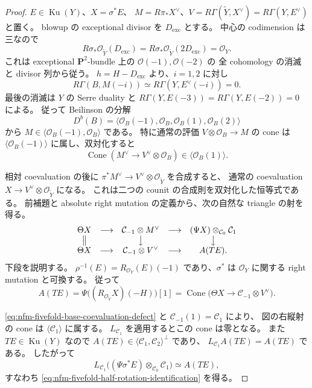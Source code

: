 \begin{proof}
$E\in\operatorname{Ku}(Y)$、$X=\sigma^*E$、
$M=R\pi_*X^\vee$、$V=R\Gamma(\widetilde Y,X^\vee)=R\Gamma(Y,E^\vee)$ と置く。
blowup の exceptional divisor を $D_{\mathrm{exc}}$ とする。
中心の codimension は三なので
\[
 R\sigma_*\mathcal O_{\widetilde Y}(D_{\mathrm{exc}})
 =R\sigma_*\mathcal O_{\widetilde Y}(2D_{\mathrm{exc}})=\mathcal O_Y.
\]
これは exceptional $\mathbf P^2$-bundle 上の $\mathcal O(-1),\mathcal O(-2)$ の
全 cohomology の消滅と divisor 列から従う。
$h=H-D_{\mathrm{exc}}$ より、$i=1,2$ に対し
\[
 R\Gamma(B,M(-i))
 \simeq R\Gamma(Y,E^\vee(-i))=0.
\]
最後の消滅は $Y$ の Serre duality と
$R\Gamma(Y,E(-3))=R\Gamma(Y,E(-2))=0$ による。
従って Beilinson の分解
\[
 D^b(B)=\langle\mathcal O_B(-1),\mathcal O_B,
                    \mathcal O_B(1),\mathcal O_B(2)\rangle
\]
から $M\in\langle\mathcal O_B(-1),\mathcal O_B\rangle$ である。
特に通常の評価 $V\otimes\mathcal O_B\to M$ の cone は
$\langle\mathcal O_B(-1)\rangle$ に属し、双対化すると
\begin{equation}\label{eq:nfm-fivefold-base-coevaluation-defect}
 \operatorname{Cone}(M^\vee\longrightarrow V^\vee\otimes\mathcal O_B)
 \in\langle\mathcal O_B(1)\rangle.
\end{equation}

相対 coevaluation の後に
$\pi^*M^\vee\to V^\vee\otimes\mathcal O_{\widetilde Y}$ を合成すると、
通常の coevaluation $X\to V^\vee\otimes\mathcal O_{\widetilde Y}$ になる。
これは二つの counit の合成則を双対化した恒等式である。
前補題と absolute right mutation の定義から、次の自然な triangle の射を得る。
\[
\begin{array}{ccccc}
 \Theta X&\longrightarrow&\mathcal C_{-1}\otimes M^\vee
 &\longrightarrow&(\Psi X)\otimes_{\mathcal C_0}\mathcal C_1\\
 \big\Vert&&\big\downarrow&&\big\downarrow\\
 \Theta X&\longrightarrow&\mathcal C_{-1}\otimes V^\vee
 &\longrightarrow&A(TE).
\end{array}
\]
下段を説明する。
$\rho^{-1}(E)=R_{\mathcal O_Y}(E)(-1)$ であり、$\sigma^*$ は
$\mathcal O_Y$ に関する right mutation と可換する。
従って
\[
 A(TE)=\Psi\bigl((R_{\mathcal O_{\widetilde Y}}X)(-H)\bigr)[1]
 =\operatorname{Cone}\bigl(\Theta X\to\mathcal C_{-1}\otimes V^\vee\bigr).
\]

\eqref{eq:nfm-fivefold-base-coevaluation-defect} と $\mathcal C_{-1}(1)=\mathcal C_1$ により、
図の右縦射の cone は $\langle\mathcal C_1\rangle$ に属する。
$L_{\mathcal C_1}$ を適用するとこの cone は零となる。
また $TE\in\operatorname{Ku}(Y)$ なので
$A(TE)\in\langle\mathcal C_1,\mathcal C_2\rangle^\perp$ であり、
$L_{\mathcal C_1}A(TE)=A(TE)$ である。
したがって
\[
 L_{\mathcal C_1}\bigl((\Psi\sigma^*E)\otimes_{\mathcal C_0}\mathcal C_1\bigr)
 \simeq A(TE),
\]
すなわち \eqref{eq:nfm-fivefold-half-rotation-identification} を得る。


\end{proof}
